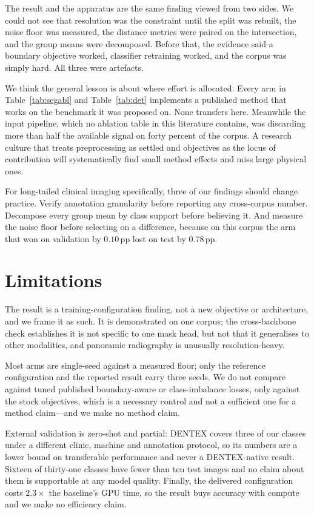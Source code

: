 \documentclass[10pt,twocolumn,letterpaper]{article}
\begin{document}
The result and the apparatus are the same finding viewed from two sides. We could
not see that resolution was the constraint until the split was rebuilt, the noise
floor was measured, the distance metrics were paired on the intersection, and the
group means were decomposed. Before that, the evidence said a boundary objective
worked, classifier retraining worked, and the corpus was simply hard. All three
were artefacts.

We think the general lesson is about where effort is allocated. Every arm in
Table~\ref{tab:segabl} and Table~\ref{tab:det} implements a published method that
works on the benchmark it was proposed on. None transfers here. Meanwhile the
input pipeline, which no ablation table in this literature contains, was
discarding more than half the available signal on forty percent of the corpus. A
research culture that treats preprocessing as settled and objectives as the locus
of contribution will systematically find small method effects and miss large
physical ones.

For long-tailed clinical imaging specifically, three of our findings should change
practice. Verify annotation granularity before reporting any cross-corpus number.
Decompose every group mean by class support before believing it. And measure the
noise floor before selecting on a difference, because on this corpus the arm that
won on validation by $0.10$\,pp lost on test by $0.78$\,pp.

\section{Limitations}

The result is a training-configuration finding, not a new objective or
architecture, and we frame it as such. It is demonstrated on one corpus; the
cross-backbone check establishes it is not specific to one mask head, but not that
it generalises to other modalities, and panoramic radiography is unusually
resolution-heavy.

Most arms are single-seed against a measured floor; only the reference
configuration and the reported result carry three seeds. We do not compare against
tuned published boundary-aware or class-imbalance losses, only against the stock
objectives, which is a necessary control and not a sufficient one for a method
claim---and we make no method claim.

External validation is zero-shot and partial: DENTEX covers three of our classes
under a different clinic, machine and annotation protocol, so its numbers are a
lower bound on transferable performance and never a DENTEX-native result. Sixteen
of thirty-one classes have fewer than ten test images and no claim about them is
supportable at any model quality. Finally, the delivered configuration costs
$2.3\times$ the baseline's GPU time, so the result buys accuracy with compute and
we make no efficiency claim.
\end{document}
